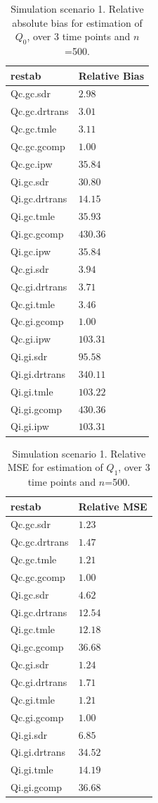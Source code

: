 \documentclass{article}\usepackage[]{graphicx}\usepackage[]{color}
\begin{document}
\clearpage


\begin{table}[H]
{\tiny
\begin{center}
\begin{tabular}{ll}
\toprule
\multicolumn{1}{l}{restab}&\multicolumn{1}{c}{Relative Bias}\tabularnewline
\midrule
Qc.gc.sdr&$  2.98$\tabularnewline
Qc.gc.drtrans&$  3.01$\tabularnewline
Qc.gc.tmle&$  3.11$\tabularnewline
Qc.gc.gcomp&$  1.00$\tabularnewline
Qc.gc.ipw&$ 35.84$\tabularnewline
Qi.gc.sdr&$ 30.80$\tabularnewline
Qi.gc.drtrans&$ 14.15$\tabularnewline
Qi.gc.tmle&$ 35.93$\tabularnewline
Qi.gc.gcomp&$430.36$\tabularnewline
Qi.gc.ipw&$ 35.84$\tabularnewline
Qc.gi.sdr&$  3.94$\tabularnewline
Qc.gi.drtrans&$  3.71$\tabularnewline
Qc.gi.tmle&$  3.46$\tabularnewline
Qc.gi.gcomp&$  1.00$\tabularnewline
Qc.gi.ipw&$103.31$\tabularnewline
Qi.gi.sdr&$ 95.58$\tabularnewline
Qi.gi.drtrans&$340.11$\tabularnewline
Qi.gi.tmle&$103.22$\tabularnewline
Qi.gi.gcomp&$430.36$\tabularnewline
Qi.gi.ipw&$103.31$\tabularnewline
\bottomrule
\end{tabular}

\caption{Simulation scenario 1. Relative absolute bias for estimation of $Q_0$, over 3 time points and $n$=500.\label{tab1}}\end{center}}

\end{table}



\begin{table}[H]
{\tiny
\begin{center}
\begin{tabular}{ll}
\toprule
\multicolumn{1}{l}{restab}&\multicolumn{1}{c}{Relative MSE}\tabularnewline
\midrule
Qc.gc.sdr&$ 1.23$\tabularnewline
Qc.gc.drtrans&$ 1.47$\tabularnewline
Qc.gc.tmle&$ 1.21$\tabularnewline
Qc.gc.gcomp&$ 1.00$\tabularnewline
Qi.gc.sdr&$ 4.62$\tabularnewline
Qi.gc.drtrans&$12.54$\tabularnewline
Qi.gc.tmle&$12.18$\tabularnewline
Qi.gc.gcomp&$36.68$\tabularnewline
Qc.gi.sdr&$ 1.24$\tabularnewline
Qc.gi.drtrans&$ 1.71$\tabularnewline
Qc.gi.tmle&$ 1.21$\tabularnewline
Qc.gi.gcomp&$ 1.00$\tabularnewline
Qi.gi.sdr&$ 6.85$\tabularnewline
Qi.gi.drtrans&$34.52$\tabularnewline
Qi.gi.tmle&$14.19$\tabularnewline
Qi.gi.gcomp&$36.68$\tabularnewline
\bottomrule
\end{tabular}

\caption{Simulation scenario 1. Relative MSE for estimation of $Q_1$, over 3 time points and $n$=500.\label{tab2}}\end{center}}

\end{table}
\end{document}
